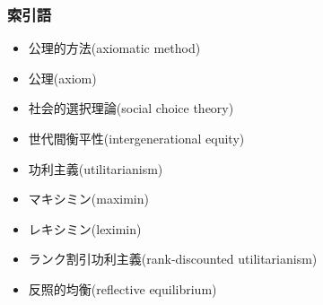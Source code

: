 \documentclass[11pt,a4paper]{article}
\begin{document}
\subsubsection*{索引語}

\begin{itemize}
  \item 公理的方法(axiomatic method)
  \item 公理(axiom)
  \item 社会的選択理論(social choice theory)
  \item 世代間衡平性(intergenerational equity)
  \item 功利主義(utilitarianism)
  \item マキシミン(maximin)
  \item レキシミン(leximin)
  \item ランク割引功利主義(rank-discounted utilitarianism)
  \item 反照的均衡(reflective equilibrium)
\end{itemize}
\end{document}
